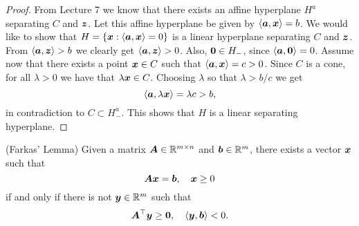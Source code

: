 \begin{proof}
 From Lecture 7 we know that there exists an affine hyperplane $H^{a}$ separating $C$ and $\bm{z}$. Let this affine hyperplane be given by 
 $\langle {\bm{a}}, {\bm{x}} \rangle=b$.
 We would like to show that $H=\{\bm{x}\mathrel{\mathop{:}} \langle {\bm{a}}, {\bm{x}} \rangle=0\}$ is a linear hyperplane separating $C$ and $\bm{z}$.
 From $\langle {\bm{a}}, {\bm{z}} \rangle>b$ we clearly get $\langle {\bm{a}}, {\bm{z}} \rangle>0$. Also, $\bm{0}\in H_-$, since $\langle {\bm{a}}, {\bm{0}} \rangle=0$. Assume now that there exists a point $\bm{x}\in C$ such that $\langle {\bm{a}}, {\bm{x}} \rangle=c>0$. Since $C$ is a cone, for all $\lambda>0$ we have that $\lambda\bm{x}\in C$. Choosing $\lambda$ so that $\lambda>b/c$ we get 
 \begin{equation*}
  \langle {\bm{a}}, {\lambda\bm{x}} \rangle=\lambda c>b,
 \end{equation*}
in contradiction to $C\subset H^{a}_-$. This shows that $H$ is a linear separating hyperplane.
\end{proof}


\begin{theorem}(Farkas' Lemma)\label{thm:farkas}
Given a matrix $\bm{A}\in \mathbb{R}^{m\times n}$ and $\bm{b}\in \mathbb{R}^m$, there
 exists a vector $\bm{x}$ such that
 \begin{equation*}
  \bm{A}\bm{x}=\bm{b}, \quad \bm{x}\geq 0
 \end{equation*}
if and only if there is not $\bm{y}\in \mathbb{R}^m$ such that
\begin{equation*}
 \bm{A}^{\top}\bm{y}\geq \bm{0}, \quad \langle {\bm{y}}, {\bm{b}} \rangle<0. 
\end{equation*}
\end{theorem}

